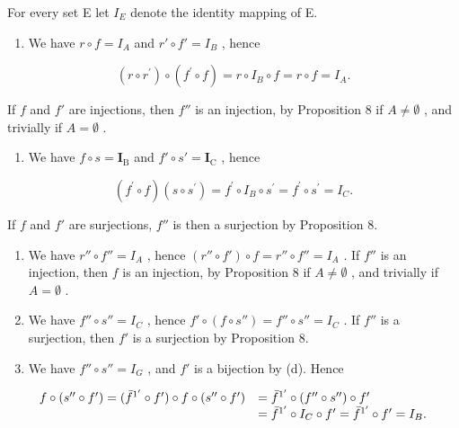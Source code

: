 For every set E let \(I_{E}\) denote the identity mapping of E.

\begin{enumerate}
\def\labelenumi{(\alph{enumi})}
\tightlist
\item
  We have \(r \circ f = I_A\) and \(r' \circ f' = I_B\) , hence
\end{enumerate}

\[
\left(r \circ r ^ {\prime}\right) \circ \left(f ^ {\prime} \circ f\right) = r \circ I _ {B} \circ f = r \circ f = I _ {A}.
\]

If \(f\) and \(f'\) are injections, then \(f''\) is an injection, by Proposition 8 if \(A \neq \emptyset\) , and trivially if \(A = \emptyset\) .

\begin{enumerate}
\def\labelenumi{(\alph{enumi})}
\setcounter{enumi}{1}
\tightlist
\item
  We have \(f \circ s = \mathbf{I}_{\mathrm{B}}\) and \(f' \circ s' = \mathbf{I}_{\mathrm{C}}\) , hence
\end{enumerate}

\[
(f ^ {\prime} \circ f) (s \circ s ^ {\prime}) = f ^ {\prime} \circ I _ {B} \circ s ^ {\prime} = f ^ {\prime} \circ s ^ {\prime} = I _ {C}.
\]

If \(f\) and \(f'\) are surjections, \(f''\) is then a surjection by Proposition 8.

\begin{enumerate}
\def\labelenumi{(\alph{enumi})}
\setcounter{enumi}{2}
\item
  We have \(r'' \circ f'' = I_A\) , hence \((r'' \circ f') \circ f = r'' \circ f'' = I_A\) . If \(f''\) is an injection, then \(f\) is an injection, by Proposition 8 if \(A \neq \emptyset\) , and trivially if \(A = \emptyset\) .
\item
  We have \(f'' \circ s'' = I_C\) , hence \(f' \circ (f \circ s'') = f'' \circ s'' = I_C\) . If \(f''\) is a surjection, then \(f'\) is a surjection by Proposition 8.
\item
  We have \(f'' \circ s'' = I_G\) , and \(f'\) is a bijection by (d). Hence
\end{enumerate}

\[
\begin{array}{r l} f \circ (s ^ {\prime \prime} \circ f ^ {\prime}) = (\bar {f} ^ {1 ^ {\prime}} \circ f ^ {\prime}) \circ f \circ (s ^ {\prime \prime} \circ f ^ {\prime}) & = \bar {f} ^ {1 ^ {\prime}} \circ (f ^ {\prime \prime} \circ s ^ {\prime \prime}) \circ f ^ {\prime} \\ & = \bar {f} ^ {1 ^ {\prime}} \circ I _ {C} \circ f ^ {\prime} = \bar {f} ^ {1 ^ {\prime}} \circ f ^ {\prime} = I _ {B}. \end{array}
\]

